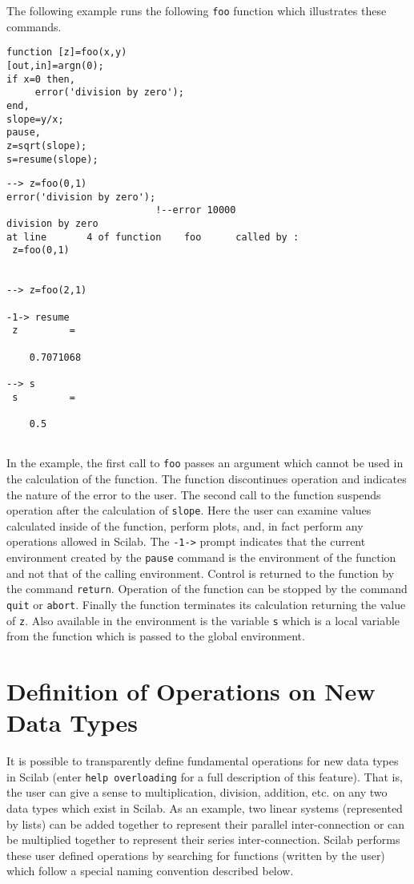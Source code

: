 The following example runs the following {\tt foo} function which
illustrates these commands.
\begin{verbatim}
function [z]=foo(x,y)
[out,in]=argn(0);
if x=0 then,
     error('division by zero');
end,
slope=y/x;
pause,
z=sqrt(slope);
s=resume(slope);
\end{verbatim}
\begin{verbatim} 
--> z=foo(0,1)
error('division by zero');
                          !--error 10000 
division by zero                                                                
at line       4 of function    foo      called by :  
 z=foo(0,1)
 
 
--> z=foo(2,1)
 
-1-> resume
 z         =
 
    0.7071068  
 
--> s
 s         =
 
    0.5  
 
\end{verbatim}
In the example, the first call to {\tt foo} passes an argument which cannot
be used in the calculation of the function.  The function discontinues
operation and indicates the nature of the error to the user.  The second call
to the function suspends operation after the calculation of {\tt slope}.
Here the user can examine values calculated inside of the function,
perform plots, and, in fact perform any operations 
allowed in Scilab.  The {\tt -1->} prompt indicates that the current
environment created by the {\tt pause} command is the environment 
of the function and not that of the calling environment.  Control is 
returned to the function by the command {\tt return}.  Operation of the
function can be stopped by the command {\tt quit} or {\tt abort}.
Finally the function terminates its calculation returning the
value of {\tt z}.  Also available in the environment is the variable
{\tt s} which is a local variable from the function which is passed to
the global environment.

\section{Definition of Operations on New Data Types}
\label{s4.3}

	It is possible to transparently define fundamental operations 
for new data types in Scilab (enter {\tt help overloading} for 
a full description of this feature).
That is, the user can give a sense to multiplication, division, addition, etc.
on any two data types which exist in Scilab.  As an example, two linear
systems (represented by lists)
can be added together to represent their parallel inter-connection
or can be multiplied together to represent their series inter-connection.
Scilab performs these user defined operations by searching for functions
(written by the user) which follow a special naming convention described
below.

